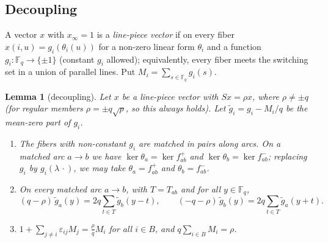 \documentclass[11pt]{amsart}
\newtheorem{lemma}[theorem]{Lemma}
\theoremstyle{definition}
\theoremstyle{remark}
\newcommand{\F}{\mathbb{F}}
\begin{document}
\subsection{Decoupling}\label{sec:decoupling}
A vector $x$ with $x_\infty=1$ is a \emph{line-piece vector} if on every fiber $x(i,u)=g_i(\theta_i(u))$ for a non-zero linear
form $\theta_i$ and a function $g_i\colon\F_q\to\{\pm1\}$ (constant $g_i$ allowed); equivalently, every fiber meets the
switching set in a union of parallel lines. Put $M_i=\sum_{s\in\F_q}g_i(s)$.

\begin{lemma}[decoupling]\label{lem:decouple}
Let $x$ be a line-piece vector with $Sx=\rho x$, where $\rho\ne\pm q$ (for regular members $\rho=\pm q\sqrt p$, so this
always holds). Let $\tilde g_i=g_i-M_i/q$ be the mean-zero part of $g_i$.
\begin{enumerate}
\item[(D1)] The fibers with non-constant $g_i$ are matched in pairs along arcs. On a matched arc $a\to b$ we have
$\ker\theta_a=\ker f^+_{ab}$ and $\ker\theta_b=\ker f^-_{ab}$; replacing $g_i$ by $g_i(\lambda\,\cdot)$, we may take
$\theta_a=f^+_{ab}$ and $\theta_b=f^-_{ab}$.
\item[(D2)] On every matched arc $a\to b$, with $T=T_{ab}$ and for all $y\in\F_q$,
\[(q-\rho)\,\tilde g_a(y)=2q\sum_{t\in T}\tilde g_b(y-t),\qquad(-q-\rho)\,\tilde g_b(y)=2q\sum_{t\in T}\tilde g_a(y+t).\]
\item[(D3)] $1+\sum_{j\ne i}\varepsilon_{ij}M_j=\frac{\rho}{q}M_i$ for all $i\in B$, and $q\sum_{i\in B}M_i=\rho$.
\end{enumerate}
\end{lemma}
\end{document}
